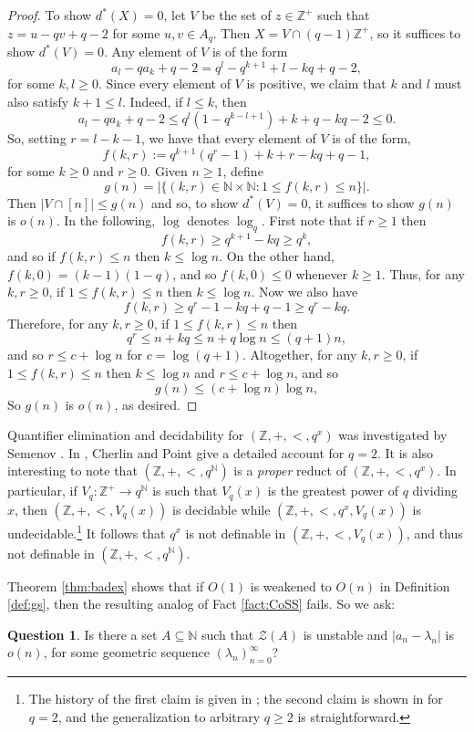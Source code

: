 \documentclass{amsart}
\def\seq{\subseteq}
\newcommand{\cZ}{\mathcal{Z}}
\def\N{\mathbb N}
\def\Z{\mathbb Z}
\theoremstyle{definition}
\newtheorem{question}[theorem]{Question}
\begin{document}
\begin{proof}
To show $d^*(X)=0$, let $V$ be the set of $z\in\Z^+$ such that $z=u-qv+q-2$ for some $u,v\in A_q$. Then $X=V\cap(q-1)\Z^+$, so it suffices to show $d^*(V)=0$. Any element of $V$ is of the form 
\[
a_l-qa_k+q-2=q^l-q^{k+1}+l-kq+q-2,
\]
for some $k,l\geq 0$. Since every element of $V$ is positive, we claim that $k$ and $l$ must also satisfy $k+1\leq l$. Indeed, if $l\leq k$, then
\[
a_l-qa_k+q-2\leq q^l(1-q^{k-l+1})+k+q-kq-2\leq 0.
\]
So, setting $r=l-k-1$, we have that every element of $V$ is of the form,
\[
f(k,r):=q^{k+1}(q^r-1)+k+r-kq+q-1,
\]
for some $k\geq 0$ and $r\geq 0$. Given $n\geq 1$, define
\[
g(n)=|\{(k,r)\in\N\times\N:1\leq f(k,r)\leq n\}|.
\]
Then $|V\cap [n]|\leq g(n)$ and so, to show $d^*(V)=0$, it suffices to show $g(n)$ is $o(n)$. In the following, $\log$ denotes $\log_q$. First note that if $r\geq 1$ then
\[
f(k,r)\geq q^{k+1}-kq\geq q^k,
\]
and so if $f(k,r)\leq n$ then $k\leq \log n$. On the other hand, $f(k,0)=(k-1)(1-q)$, and so $f(k,0)\leq 0$ whenever $k\geq 1$. Thus, for any $k,r\geq 0$, if $1\leq f(k,r)\leq n$ then $k\leq \log n$. Now we also have
\[
f(k,r)\geq q^r-1-kq+q-1\geq q^r-kq.
\]
Therefore, for any $k,r\geq 0$, if $1\leq f(k,r)\leq n$ then
\[
q^r\leq n+kq\leq n+q\log n\leq (q+1)n,
\]
 and so $r\leq c+\log n$ for $c=\log(q+1)$. Altogether, for any $k,r\geq 0$, if $1\leq f(k,r)\leq n$ then $k\leq \log n$ and $r\leq c+\log n$, and so
\[
g(n)\leq (c+\log n)\log n,
\]
So $g(n)$ is $o(n)$, as desired.
\end{proof}



Quantifier elimination and decidability for $(\Z,+,<,q^x)$ was investigated by Semenov \cite{Semenov}. In \cite{ChPo}, Cherlin and Point give a detailed account for $q=2$. It is also interesting to note that $(\Z,+,<,q^{\N})$ is  a \emph{proper} reduct of $(\Z,+,<,q^x)$. In particular, if $V_q\colon \Z^+\to q^{\N}$ is such that $V_q(x)$ is the greatest power of $q$ dividing $x$, then $(\Z,+,<,V_q(x))$ is decidable while $(\Z,+,<,q^x,V_q(x))$ is undecidable.\footnote{The history of the first claim is given in \cite{MiVi}; the second claim is shown in \cite{ChPo} for $q=2$, and the generalization to arbitrary $q\geq 2$ is straightforward.} It follows that $q^x$ is not definable in $(\Z,+,<,V_q(x))$, and thus not definable in $(\Z,+,<,q^{\N})$. 


Theorem \ref{thm:badex} shows that if $O(1)$ is weakened to $O(n)$ in Definition \ref{def:gs}, then the resulting analog of Fact \ref{fact:CoSS} fails. So we ask:

\begin{question}
Is there a set $A\seq\N$ such that $\cZ(A)$ is unstable and $|a_n-\lambda_n|$ is $o(n)$, for some geometric sequence $(\lambda_n)_{n=0}^\infty$?
\end{question} 
\end{document}
